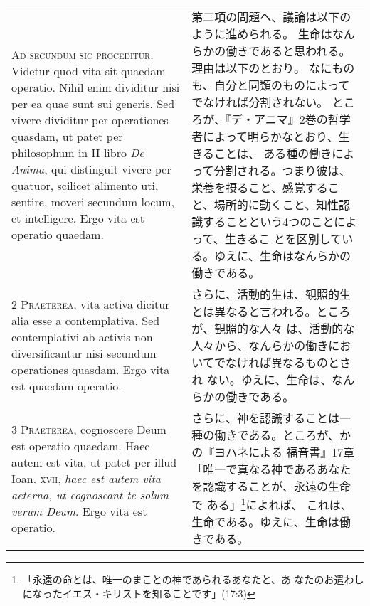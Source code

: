 \documentclass[10pt]{jsarticle} %
\begin{document}
\begin{longtable}{p{21em}p{21em}}


{\huge A}{\scshape d secundum sic proceditur}. Videtur quod vita sit
 quaedam operatio. Nihil enim dividitur nisi per ea quae sunt sui
 generis. Sed vivere dividitur per operationes quasdam, ut patet per
 philosophum in II libro {\itshape De Anima}, qui distinguit vivere per quatuor,
 scilicet alimento uti, sentire, moveri secundum locum, et
 intelligere. Ergo vita est operatio quaedam.


&

第二項の問題へ、議論は以下のように進められる。
生命はなんらかの働きであると思われる。理由は以下のとおり。
なにものも、自分と同類のものによってでなければ分割されない。
ところが、『デ・アニマ』2巻の哲学者によって明らかなとおり、生きることは、
 ある種の働きによって分割される。つまり彼は、栄養を摂ること、感覚するこ
 と、場所的に動くこと、知性認識することという4つのことによって、生きるこ
 とを区別している。ゆえに、生命はなんらかの働きである。


\\



{\scshape 2 Praeterea}, vita activa dicitur alia esse a
 contemplativa. Sed contemplativi ab activis non diversificantur nisi
 secundum operationes quasdam. Ergo vita est quaedam operatio.


&

さらに、活動的生は、観照的生とは異なると言われる。ところが、観照的な人々
 は、活動的な人々から、なんらかの働きにおいてでなければ異なるものとされ
 ない。ゆえに、生命は、なんらかの働きである。

\\



{\scshape 3 Praeterea}, cognoscere Deum est operatio quaedam. Haec autem
 est vita, ut patet per illud Ioan. {\scshape xvii}, {\itshape haec est autem vita aeterna,
 ut cognoscant te solum verum Deum}. Ergo vita est operatio.


&

さらに、神を認識することは一種の働きである。ところが、かの『ヨハネによる
 福音書』17章「唯一で真なる神であるあなたを認識することが、永遠の生命で
 ある」\footnote{「永遠の命とは、唯一のまことの神であられるあなたと、あ
 なたのお遣わしになったイエス・キリストを知ることです」(17:3)}によれば、
 これは、生命である。ゆえに、生命は働きである。

\\




\end{longtable}
\end{document}
